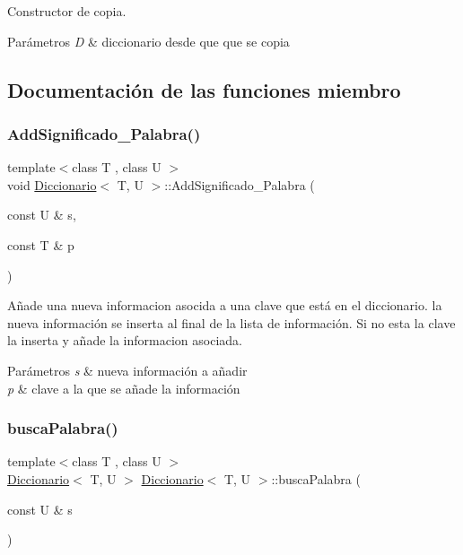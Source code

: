 Constructor de copia. 


\begin{DoxyParams}{Parámetros}
{\em D} & diccionario desde que que se copia \\
\hline
\end{DoxyParams}


\subsection{Documentación de las funciones miembro}
\mbox{\label{classDiccionario_a7e167da231bff610001df3c20cc9b7a7}} 
\subsubsection{\texorpdfstring{Add\+Significado\+\_\+\+Palabra()}{AddSignificado\_Palabra()}}
{\footnotesize\ttfamily template$<$class T , class U $>$ \\
void \hyperlink{classDiccionario}{Diccionario}$<$ T, U $>$\+::Add\+Significado\+\_\+\+Palabra (\begin{DoxyParamCaption}\item[{const U \&}]{s,  }\item[{const T \&}]{p }\end{DoxyParamCaption})}



Añade una nueva informacion asocida a una clave que está en el diccionario. la nueva información se inserta al final de la lista de información. Si no esta la clave la inserta y añade la informacion asociada. 


\begin{DoxyParams}{Parámetros}
{\em s} & nueva información a añadir \\
\hline
{\em p} & clave a la que se añade la información \\
\hline
\end{DoxyParams}
\mbox{\label{classDiccionario_a293ea5b3aab95f544e2fae42664756fb}} 
\subsubsection{\texorpdfstring{busca\+Palabra()}{buscaPalabra()}}
{\footnotesize\ttfamily template$<$class T , class U $>$ \\
\hyperlink{classDiccionario}{Diccionario}$<$ T, U $>$ \hyperlink{classDiccionario}{Diccionario}$<$ T, U $>$\+::busca\+Palabra (\begin{DoxyParamCaption}\item[{const U \&}]{s }\end{DoxyParamCaption})}



